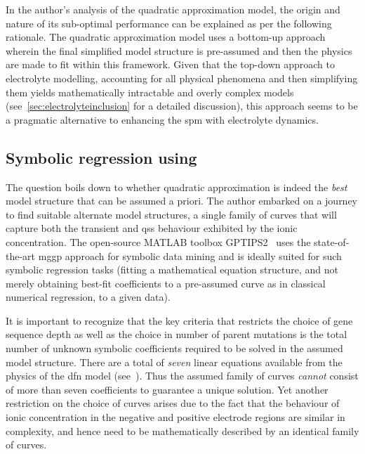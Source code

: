

In the  author's analysis of the  quadratic approximation model, the  origin and
nature of  its sub-optimal  performance can  be explained  as per  the following
rationale. The quadratic  approximation model uses a  bottom-up approach wherein
the final  simplified model structure  is pre-assumed  and then the  physics are
made  to  fit  within  this  framework. Given  that  the  top-down  approach  to
electrolyte  modelling, \ie{}  accounting for  all physical  phenomena and  then
simplifying  them yields  mathematically intractable  and overly  complex models
(see~\cref{sec:electrolyteinclusion} for  a detailed discussion),  this approach
seems to be a pragmatic alternative  to enhancing the \gls{spm} with electrolyte
dynamics.


\subsection{Symbolic regression using }

The  question  boils down  to  whether  quadratic  approximation is  indeed  the
\emph{best} model structure that can be assumed a priori. The author embarked on
a journey  to find suitable  alternate model  structures, \ie{} a  single family
of  curves  that  will  capture  both  the  transient  and  \gls{qss}  behaviour
exhibited by  the ionic  concentration. The open-source  \textsc{MATLAB} toolbox
GPTIPS2~\cite{Searson2015}  uses the  state-of-the-art  \gls{mggp} approach  for
symbolic data  mining and is ideally  suited for such symbolic  regression tasks
(fitting a  mathematical equation structure,  and not merely  obtaining best-fit
coefficients to a  pre-assumed curve as in classical numerical  regression, to a
given data).

It  is  important  to  recognize  that  the  key  criteria  that  restricts  the
choice  of gene  sequence  depth as  well  as  the choice  in  number of  parent
mutations  is  the  total  number  of  unknown  symbolic  coefficients  required
to  be   solved  in  the  assumed   model  structure.  There  are   a  total  of
\emph{seven} linear equations available from  the physics of the \gls{dfn} model
(see~).  Thus the  assumed
family  of curves  \emph{cannot}  consist  of more  than  seven coefficients  to
guarantee a  unique solution. Yet  another restriction  on the choice  of curves
arises due to the fact that the behaviour of ionic concentration in the negative
and positive electrode  regions are similar in complexity, and  hence need to be
mathematically described by an identical family of curves.

